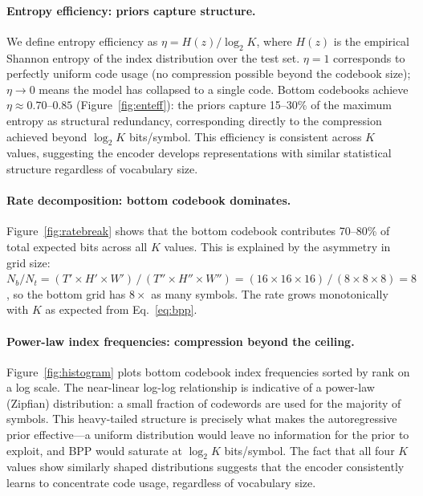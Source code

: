\documentclass{article}
\begin{document}
\paragraph{Entropy efficiency: priors capture structure.}
We define entropy efficiency as $\eta = H(z) / \log_2 K$, where $H(z)$ is the
empirical Shannon entropy of the index distribution over the test set.
$\eta = 1$ corresponds to perfectly uniform code usage (no compression
possible beyond the codebook size); $\eta \to 0$ means the model has collapsed
to a single code.
Bottom codebooks achieve $\eta \approx 0.70$--$0.85$
(Figure~\ref{fig:enteff}): the priors capture 15--30\% of the maximum entropy
as structural redundancy, corresponding directly to the compression achieved
beyond $\log_2 K$ bits/symbol.
This efficiency is consistent across $K$ values, suggesting the encoder
develops representations with similar statistical structure regardless of
vocabulary size.

\paragraph{Rate decomposition: bottom codebook dominates.}
Figure~\ref{fig:ratebreak} shows that the bottom codebook contributes
70--80\% of total expected bits across all $K$ values.
This is explained by the asymmetry in grid size:
$N_b/N_t = (T'\!\times\!H'\!\times\!W')\,/\,(T''\!\times\!H''\!\times\!W'')
= (16\!\times\!16\!\times\!16)\,/\,(8\!\times\!8\!\times\!8) = 8$,
so the bottom grid has $8\times$ as many symbols.
The rate grows monotonically with $K$ as expected from Eq.~\ref{eq:bpp}.

\paragraph{Power-law index frequencies: compression beyond the ceiling.}
Figure~\ref{fig:histogram} plots bottom codebook index frequencies sorted
by rank on a log scale.
The near-linear log-log relationship is indicative of a power-law (Zipfian)
distribution: a small fraction of codewords are used for the majority of
symbols.
This heavy-tailed structure is precisely what makes the autoregressive prior
effective---a uniform distribution would leave no information for the prior
to exploit, and BPP would saturate at $\log_2 K$ bits/symbol.
The fact that all four $K$ values show similarly shaped distributions
suggests that the encoder consistently learns to concentrate code usage,
regardless of vocabulary size.
\end{document}
